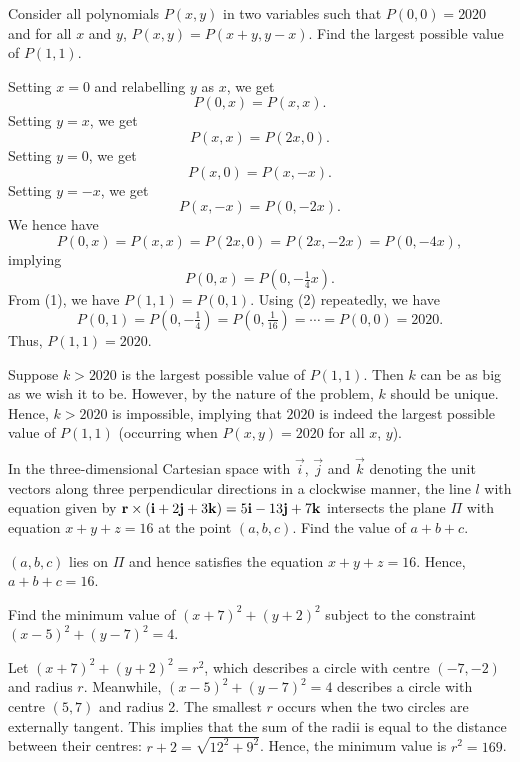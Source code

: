 \begin{question}[2020]\label{Q::2021-O-1-6}
    Consider all polynomials $P(x, y)$ in two variables such that $P(0, 0) = 2020$ and for all $x$ and $y$, $P(x, y) = P(x + y, y - x)$. Find the largest possible value of $P(1, 1)$.
\end{question}
\begin{solution}
    Setting $x=0$ and relabelling $y$ as $x$, we get \[P(0, x) = P(x, x) \tag{1}.\] Setting $y = x$, we get \[P(x, x) = P(2x , 0).\] Setting $y = 0$, we get \[P(x, 0) = P(x, -x).\] Setting $y = -x$, we get \[P(x, -x) = P(0, -2x).\] We hence have \[P(0, x) = P(x, x) = P(2x, 0) = P(2x, -2x) = P(0, -4x),\] implying \[P(0, x) = P(0, -\tfrac14 x) \tag{2}.\] From (1), we have $P(1, 1) = P(0, 1)$. Using (2) repeatedly, we have \[P(0, 1) = P(0, -\tfrac14) = P(0, \tfrac1{16}) = \cdots = P(0, 0) = 2020.\] Thus, $P(1, 1) = 2020$.
\end{solution}
\begin{solution}
    Suppose $k > 2020$ is the largest possible value of $P(1, 1)$. Then $k$ can be as big as we wish it to be. However, by the nature of the problem, $k$ should be unique. Hence, $k > 2020$ is impossible, implying that $2020$ is indeed the largest possible value of $P(1, 1)$ (occurring when $P(x, y) = 2020$ for all $x$, $y$).
\end{solution}

\begin{question}[16]\label{Q::2021-O-1-7}
    In the three-dimensional Cartesian space with $\vec i$, $\vec j$ and $\vec k$ denoting the unit vectors along three perpendicular directions in a clockwise manner, the line $l$ with equation given by $\mathbf{r} \times (\mathbf{i} + 2 \mathbf{j} + 3 \mathbf{k}) = 5\mathbf{i} - 13\mathbf{j} + 7\mathbf{k}$ intersects the plane $\Pi$ with equation $x + y + z = 16$ at the point $(a, b, c)$. Find the value of $a + b + c$.
\end{question}
\begin{solution*}
    $(a, b, c)$ lies on $\Pi$ and hence satisfies the equation $x + y + z = 16$. Hence, $a + b + c = 16$.
\end{solution*}

\begin{question}[169]\label{Q::2021-O-1-8}
    Find the minimum value of $(x + 7)^2 + (y + 2)^2$ subject to the constraint $(x-5)^2 + (y-7)^2 = 4$.
\end{question}
\begin{solution*}
    Let $(x + 7)^2 + (y + 2)^2 = r^2$, which describes a circle with centre $(-7, -2)$ and radius $r$. Meanwhile, $(x-5)^2 + (y-7)^2 = 4$ describes a circle with centre $(5, 7)$ and radius 2. The smallest $r$ occurs when the two circles are externally tangent. This implies that the sum of the radii is equal to the distance between their centres: $r + 2 = \sqrt{12^2 + 9^2}$. Hence, the minimum value is $r^2 = 169$.
\end{solution*}

